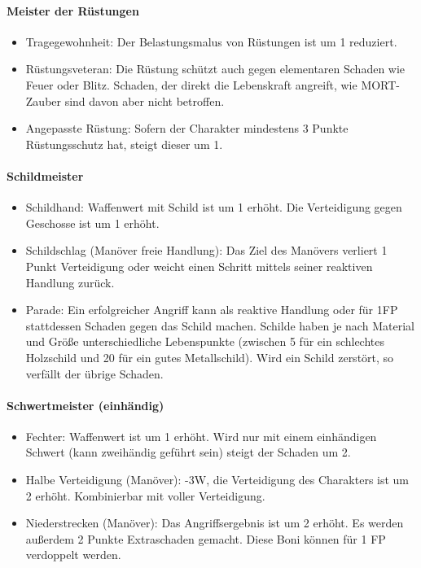 \documentclass{article}
\begin{document}
\paragraph{Meister der Rüstungen}

\begin{itemize}
\item Tragegewohnheit: Der Belastungsmalus von Rüstungen ist um 1 reduziert.
\item Rüstungsveteran: Die Rüstung schützt auch gegen elementaren Schaden wie Feuer oder Blitz. Schaden, der direkt die Lebenskraft angreift, wie MORT-Zauber sind davon aber nicht betroffen.
\item Angepasste Rüstung: Sofern der Charakter mindestens 3 Punkte Rüstungsschutz hat, steigt dieser um 1.
\end{itemize}

\paragraph{Schildmeister}

\begin{itemize}
\item Schildhand: Waffenwert mit Schild ist um 1 erhöht. Die Verteidigung gegen Geschosse ist um 1 erhöht.
\item Schildschlag (Manöver freie Handlung): Das Ziel des Manövers verliert 1 Punkt Verteidigung oder weicht einen Schritt mittels seiner reaktiven Handlung zurück.
\item Parade: Ein erfolgreicher Angriff kann als reaktive Handlung oder für 1FP stattdessen Schaden gegen das Schild machen. Schilde haben je nach Material und Größe unterschiedliche Lebenspunkte (zwischen 5 für ein schlechtes Holzschild und 20 für ein gutes Metallschild). Wird ein Schild zerstört, so verfällt der übrige Schaden.
\end{itemize}

\paragraph{Schwertmeister (einhändig)}

\begin{itemize}
\item Fechter: Waffenwert ist um 1 erhöht. Wird nur mit einem einhändigen Schwert (kann zweihändig geführt sein) steigt der Schaden um 2.
\item Halbe Verteidigung (Manöver): -3W, die Verteidigung des Charakters ist um 2 erhöht. Kombinierbar mit voller Verteidigung.
\item Niederstrecken (Manöver): Das Angriffsergebnis ist um 2 erhöht. Es werden außerdem 2 Punkte Extraschaden gemacht. Diese Boni können für 1 FP verdoppelt werden.
\end{itemize}
\end{document}
